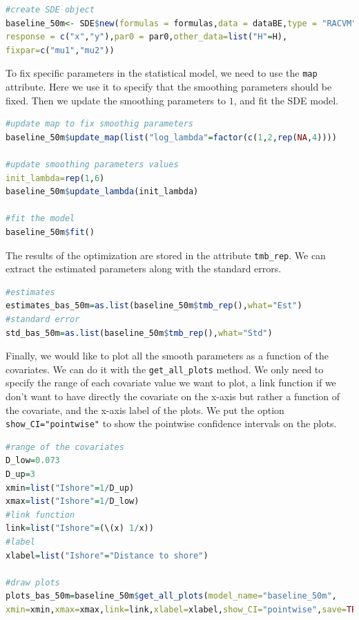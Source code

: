 \documentclass[aoas]{imsart}
\theoremstyle{definition}
\theoremstyle{remark}
\theoremstyle{remark}
\newcommand {\1}{\mathbb{1}}
\begin{document}
\begin{lstlisting}[language=R]
#create SDE object
baseline_50m<- SDE$new(formulas = formulas,data = dataBE,type = "RACVM",
response = c("x","y"),par0 = par0,other_data=list("H"=H),
fixpar=c("mu1","mu2"))
\end{lstlisting}

To fix specific parameters in the statistical model, we need to use the \texttt{map} attribute. Here we use it to specify that the smoothing parameters should be fixed. Then we update the smoothing parameters to $1$, and fit the SDE model.

\begin{lstlisting}[language=R]
#update map to fix smoothig parameters
baseline_50m$update_map(list("log_lambda"=factor(c(1,2,rep(NA,4))))

#update smoothing parameters values
init_lambda=rep(1,6)
baseline_50m$update_lambda(init_lambda)

#fit the model
baseline_50m$fit()
\end{lstlisting}

The results of the optimization are stored in the attribute \texttt{tmb\_rep}.
We can extract the estimated parameters along with the standard errors.

\begin{lstlisting}[language=R]
#estimates
estimates_bas_50m=as.list(baseline_50m$tmb_rep(),what="Est")
#standard error
std_bas_50m=as.list(baseline_50m$tmb_rep(),what="Std")
\end{lstlisting}

Finally, we would like to plot all the smooth parameters as a function of the covariates. 
We can do it with the \texttt{get\_all\_plots} method.
We only need to specify the range of each covariate value we want to plot, a link function if we don't want to have directly the covariate on the x-axis but rather a function of the covariate, and the x-axis label of the plots. We put the option \texttt{show\_CI="pointwise"} to show the pointwise confidence intervals on the plots.

\begin{lstlisting}[language=R]
#range of the covariates
D_low=0.073
D_up=3
xmin=list("Ishore"=1/D_up)
xmax=list("Ishore"=1/D_low)
#link function
link=list("Ishore"=(\(x) 1/x))
#label
xlabel=list("Ishore"="Distance to shore")

#draw plots
plots_bas_50m=baseline_50m$get_all_plots(model_name="baseline_50m",
xmin=xmin,xmax=xmax,link=link,xlabel=xlabel,show_CI="pointwise",save=TRUE)
\end{lstlisting}
\end{document}
